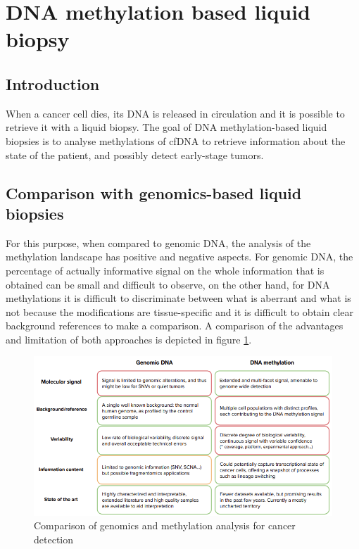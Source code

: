 \section{DNA methylation based liquid biopsy}

    \subsection{Introduction}
    When a cancer cell dies, its DNA is released in circulation and it is possible to retrieve it with a liquid biopsy.
    The goal of DNA methylation-based liquid biopsies is to analyse methylations of cfDNA to retrieve information about the state of the patient, and possibly detect early-stage tumors.

    \subsection{Comparison with genomics-based liquid biopsies}
    For this purpose, when compared to genomic DNA, the analysis of the methylation landscape has positive and negative aspects.
    For genomic DNA, the percentage of actually informative signal on the whole information that is obtained can be small and difficult to observe, on the other hand, for DNA methylations it is difficult to discriminate between what is aberrant and what is not because the modifications are tissue-specific and it is difficult to obtain clear background references to make a comparison.
    A comparison of the advantages and limitation of both approaches is depicted in figure \ref{fig:comp}.

    \begin{figure}[H]
    \centering
        \includegraphics[width=\linewidth]{comp.png}
        \caption{\label{fig:comp}Comparison of genomics and methylation analysis for cancer detection}
    \end{figure}

